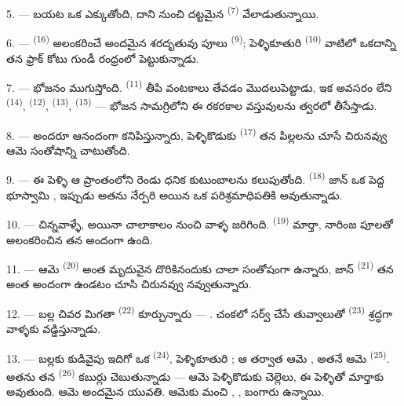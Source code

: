 5. ---  బయట ఒక  ఎక్కుతోంది, దాని నుంచి దట్టమైన
 \textsuperscript{(7)} వేలాడుతున్నాయి.

6. ---  \textsuperscript{(16)} అలంకరించే అందమైన శరదృతువు పూలు 
\textsuperscript{(9)}; పెళ్ళికూతురి  \textsuperscript{(10)} వాటిలో ఒకదాన్ని తన
ఫ్రాక్ కోటు గుండీ రంధ్రంలో పెట్టుకున్నాడు.

7. --- భోజనం ముగుస్తోంది.  \textsuperscript{(11)} తీపి వంటకాలు తేవడం
మొదలుపెట్టాడు, ఇక అవసరం లేని  \textsuperscript{(14)}, 
\textsuperscript{(12)},  \textsuperscript{(13)}, 
\textsuperscript{(15)} — భోజన సామగ్రిలోని ఈ రకరకాల వస్తువులను త్వరలో తీసేస్తాడు.

\VUsaut{3.0mm}

8. --- అందరూ ఆనందంగా కనిపిస్తున్నారు, పెళ్ళికొడుకు  \textsuperscript{(17)} తన
పిల్లలను చూసే చిరునవ్వు ఆమె సంతోషాన్ని చాటుతోంది.

9. --- ఈ పెళ్ళి ఆ ప్రాంతంలోని రెండు ధనిక కుటుంబాలను కలుపుతోంది. 
\textsuperscript{(18)} జాన్ ఒక పెద్ద భూస్వామి , ఇప్పుడు అతను నేర్పరి అయిన ఒక
పరిశ్రమాధిపతికి  అవుతున్నాడు.

10. ---  చిన్నవాళ్ళే, అయినా చాలాకాలం నుంచి వాళ్ళ 
జరిగింది.  \textsuperscript{(19)} మార్తా, నారింజ పూలతో అలంకరించిన తన
 అందంగా ఉంది.

11. --- ఆమె  \textsuperscript{(20)} అంత మృదువైన  దొరికినందుకు
చాలా సంతోషంగా ఉన్నారు, జాన్  \textsuperscript{(21)} తన  అంత
అందంగా ఉండటం చూసి చిరునవ్వు నవ్వుతున్నారు.

12. --- బల్ల చివర మిగతా  \textsuperscript{(22)} కూర్చున్నారు —
. చంకలో సర్వ్ చేసే
తువ్వాలుతో  \textsuperscript{(23)} శ్రద్ధగా వాళ్ళకు
వడ్డిస్తున్నాడు.

\VUsaut{3.0mm}

13. --- బల్లకు కుడివైపు ఇదిగో ఒక  \textsuperscript{(24)}, పెళ్ళికూతురి
; ఆ తర్వాత ఆమె , అతనే ఆమె 
\textsuperscript{(25)}. అతను తన  \textsuperscript{(26)} కబుర్లు
చెబుతున్నాడు — ఆమె పెళ్ళికొడుకు చెల్లెలు, ఈ పెళ్ళితో మార్తాకు  అవుతుంది. ఆమె
అందమైన యువతి. ఆమెకు మంచి , , బంగారు  ఉన్నాయి.

